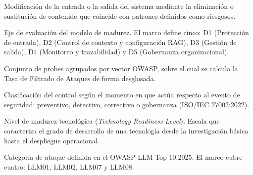 \begin{description}[leftmargin=0pt, style=nextline]
  \item[Sanitización] Modificación de la entrada o la salida del sistema mediante la eliminación o sustitución de contenido que coincide con patrones definidos como riesgosos.

  \item[Subdimensión] Eje de evaluación del modelo de madurez. El marco define cinco: D1 (Protección de entrada), D2 (Control de contexto y configuración RAG), D3 (Gestión de salida), D4 (Monitoreo y trazabilidad) y D5 (Gobernanza organizacional).

  \item[Suite] Conjunto de probes agrupados por vector OWASP, sobre el cual se calcula la Tasa de Filtrado de Ataques de forma desglosada.

  \item[Tipo funcional] Clasificación del control según el momento en que actúa respecto al evento de seguridad: preventivo, detectivo, correctivo o gobernanza (ISO/IEC 27002:2022).

  \item[TRL] Nivel de madurez tecnológica (\emph{Technology Readiness Level}). Escala que caracteriza el grado de desarrollo de una tecnología desde la investigación básica hasta el despliegue operacional.

  \item[Vector de amenaza] Categoría de ataque definida en el OWASP LLM Top 10:2025. El marco cubre cuatro: LLM01, LLM02, LLM07 y LLM08.

\end{description}